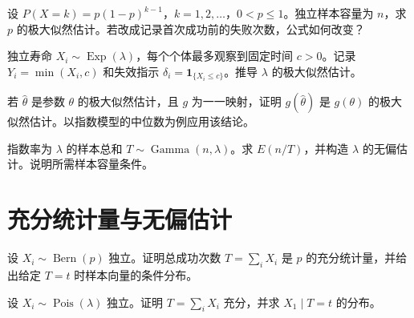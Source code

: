 \begin{exercise}[几何分布的估计与边界]\label{q:B10.3}
设 $P(X=k)=p(1-p)^{k-1}$，$k=1,2,\ldots$，$0<p\le1$。独立样本容量为 $n$，求 $p$ 的极大似然估计。若改成记录首次成功前的失败次数，公式如何改变？\par{}\end{exercise}

\begin{exercise}[带删失的指数寿命]\label{q:B10.4}
独立寿命 $X_i\sim\operatorname{Exp}(\lambda)$，每个个体最多观察到固定时间 $c>0$。记录 $Y_i=\min(X_i,c)$ 和失效指示 $\delta_i=\mathbf1_{\{X_i\le c\}}$。推导 $\lambda$ 的极大似然估计。\par{}\end{exercise}

\begin{exercise}[极大似然的不变性]\label{q:B10.5}
若 $\widehat\theta$ 是参数 $\theta$ 的极大似然估计，且 $g$ 为一一映射，证明 $g(\widehat\theta)$ 是 $g(\theta)$ 的极大似然估计。以指数模型的中位数为例应用该结论。\par{}\end{exercise}

\begin{exercise}[指数率估计的有限样本偏差]\label{q:B10.6}
指数率为 $\lambda$ 的样本总和 $T\sim\operatorname{Gamma}(n,\lambda)$。求 $E(n/T)$，并构造 $\lambda$ 的无偏估计。说明所需样本容量条件。\par{}\end{exercise}

\clearpage\section{充分统计量与无偏估计}

\begin{exercise}[伯努利样本的充分统计量]\label{q:B11.1}
设 $X_i\sim\operatorname{Bern}(p)$ 独立。证明总成功次数 $T=\sum_iX_i$ 是 $p$ 的充分统计量，并给出给定 $T=t$ 时样本向量的条件分布。\par{}\end{exercise}

\begin{exercise}[泊松样本的充分性与条件二项分布]\label{q:B11.2}
设 $X_i\sim\operatorname{Pois}(\lambda)$ 独立。证明 $T=\sum_iX_i$ 充分，并求 $X_1\mid T=t$ 的分布。\par{}\end{exercise}

